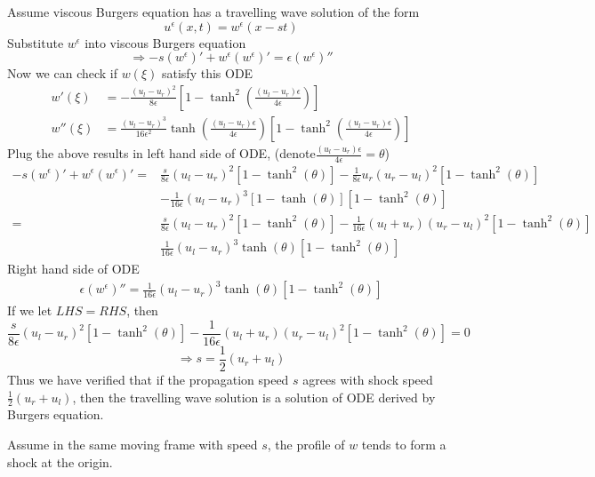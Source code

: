 \documentclass[11pt]{article}
\begin{document}
\begin{enumerate}
        	Assume viscous Burgers equation has a travelling wave solution of the form 
        	\[
        	u^{\epsilon}(x,t)=w^{\epsilon}(x-st)
        	\]	
        	Substitute $w^{\epsilon}$ into viscous Burgers equation
        	\[
        	\Rightarrow -s(w^{\epsilon})'+w^{\epsilon}(w^{\epsilon})'=\epsilon(w^{\epsilon})''
        	\]
        	Now we can check if $w(\xi)$ satisfy this ODE
        	\begin{align*}
        	w'(\xi)&=-\frac{(u_l-u_r)^2}{8\epsilon}[1-\tanh^2(\frac{(u_l-u_r)\epsilon}{4\epsilon})]\\
        	w''(\xi)&=\frac{(u_l-u_r)^3}{16\epsilon^2}\tanh(\frac{(u_l-u_r)\epsilon}{4\epsilon})[1-\tanh^2(\frac{(u_l-u_r)\epsilon}{4\epsilon})]
        	\end{align*}
        	Plug the above results in left hand side of ODE, (denote$\frac{(u_l-u_r)\epsilon}{4\epsilon}=\theta$)
        	\begin{align*}
        	-s(w^{\epsilon})'+w^{\epsilon}(w^{\epsilon})'
        	= & \frac{s}{8\epsilon}(u_l-u_r)^2[1-\tanh^2(\theta)]-\frac{1}{8\epsilon}u_r(u_r-u_l)^2[1-\tanh^2(\theta)]\\
        	& -\frac{1}{16\epsilon}(u_l-u_r)^3[1-\tanh(\theta)][1-\tanh^2(\theta)]\\
        	= & \frac{s}{8\epsilon}(u_l-u_r)^2[1-\tanh^2(\theta)]-\frac{1}{16\epsilon}(u_l+u_r)(u_r-u_l)^2[1-\tanh^2(\theta)]\\
        	& \frac{1}{16\epsilon}(u_l-u_r)^3\tanh(\theta)[1-\tanh^2(\theta)]
        	\end{align*}
        	Right hand side of ODE
        	\begin{align*}
        	\epsilon(w^{\epsilon})''=\frac{1}{16\epsilon}(u_l-u_r)^3\tanh(\theta)[1-\tanh^2(\theta)]
        	\end{align*}
        	If we let $LHS=RHS$, then
        	\[
        	\frac{s}{8\epsilon}(u_l-u_r)^2[1-\tanh^2(\theta)]-\frac{1}{16\epsilon}(u_l+u_r)(u_r-u_l)^2[1-\tanh^2(\theta)]=0
        	\]
        	\[
        	\Rightarrow s=\frac{1}{2}(u_r+u_l)
        	\]
        	Thus we have verified that if the propagation speed $s$ agrees with shock speed $\frac{1}{2}(u_r+u_l)$, then the travelling wave solution is a solution of ODE derived by Burgers equation.
        	
        	Assume in the same moving frame with speed $s$, the profile of $w$ tends to form a shock at the origin.
        	

\end{enumerate}
\end{document}
